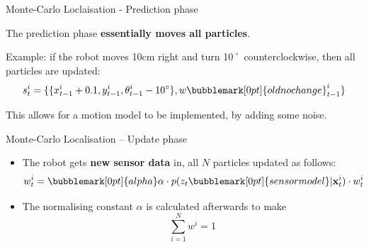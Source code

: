 \documentclass[compress]{beamer}
\begin{document}
\begin{frame}{Monte-Carlo Loclaisation - Prediction phase}

The prediction phase \textbf{essentially moves all particles}.

Example: if the robot moves 10cm right and turn 10˚ counterclockwise, then all particles are
updated:
    \Large
    \[
        s_t^i = \{ \{ x_{t-1}^i + 0.1, y_{t-1}^i, \theta_{t-1}^i - 10^{\circ}\}, w\bubblemark[0pt]{oldnochange}_{t-1}^i\}
    \]
    \normalsize

\pause

    This allows for a motion model to be implemented, by adding some noise.




\end{frame}

\begin{frame}{Monte-Carlo Localisation -- Update phase}

    \begin{itemize}
        \item The robot gets \textbf{new sensor data} in, all $N$ particles
            updated as follows:
            \Large
            \[ 
            w_t^i = \bubblemark[0pt]{alpha}\alpha \cdot p(z_t\bubblemark[0pt]{sensormodel}|\mathbf{x}_t^i) \cdot w_t^i
            \]
            \normalsize
            \vspace{3em}
        \item The normalising constant $\alpha$ is calculated afterwards to make
            \[ \sum_{i=1}^N w^i = 1 \]
    \end{itemize}



\end{frame}
\end{document}

